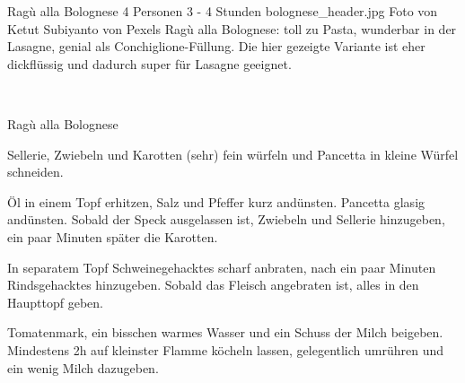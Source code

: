 \begin{myrecipe}
    {Ragù alla Bolognese}
    {4 Personen}
    {3 - 4 Stunden}
    {bolognese_header.jpg}
    {Foto von Ketut Subiyanto von Pexels}
    \freeform
    \large Ragù alla Bolognese: toll zu Pasta, wunderbar in der Lasagne, genial als Conchiglione-Füllung. Die hier gezeigte Variante ist eher dickflüssig und dadurch super für Lasagne geeignet.
    \freeform
    \newpage

    \freeform
    \mbox{}\\[-\baselineskip]%
    \parbox[b]{\textwidth}{%
    \rule{0pt}{\baselineskip}%
    \strut{\recipetitlefont Ragù alla Bolognese}\strut\hfill}%

    Sellerie, Zwiebeln und Karotten (sehr) fein würfeln und Pancetta in kleine Würfel schneiden.

    Öl in einem Topf erhitzen, Salz und Pfeffer kurz andünsten. Pancetta glasig andünsten. Sobald der Speck ausgelassen ist, Zwiebeln und Sellerie hinzugeben, ein paar Minuten später die Karotten.

    In separatem Topf Schweinegehacktes scharf anbraten, nach ein paar Minuten Rindsgehacktes hinzugeben. Sobald das Fleisch angebraten ist, alles in den Haupttopf geben.

    Tomatenmark, ein bisschen warmes Wasser und ein Schuss der Milch beigeben. Mindestens 2h auf kleinster Flamme köcheln lassen, gelegentlich umrühren und ein wenig Milch dazugeben.
    \freeform
\end{myrecipe}
